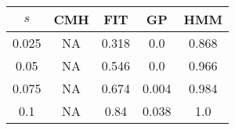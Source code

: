 \centering \begin{tabular}{c|c|c|c|c}
$s$	&CMH	&FIT	&GP	&HMM\\\hline
0.025	&NA	&0.318	&0.0	&0.868\\
0.05	&NA	&0.546	&0.0	&0.966\\
0.075	&NA	&0.674	&0.004	&0.984\\
0.1	&NA	&0.84	&0.038	&1.0\\
\end{tabular}
